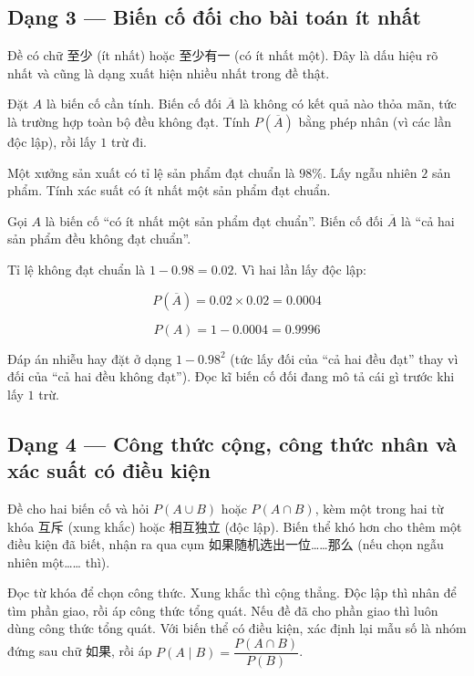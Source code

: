 \documentclass[11pt, a4paper]{article}
\begin{document}
\subsection{Dạng 3 — Biến cố đối cho bài toán ít nhất}

 Đề có chữ 至少 (ít nhất) hoặc 至少有一 (có ít nhất một). Đây là dấu hiệu rõ nhất và cũng là dạng xuất hiện nhiều nhất trong đề thật.

 Đặt $A$ là biến cố cần tính. Biến cố đối $\overline{A}$ là không có kết quả nào thỏa mãn, tức là trường hợp toàn bộ đều không đạt. Tính $P(\overline{A})$ bằng phép nhân (vì các lần độc lập), rồi lấy $1$ trừ đi.

\begin{vidu}[{3}]
Một xưởng sản xuất có tỉ lệ sản phẩm đạt chuẩn là $98\%$. Lấy ngẫu nhiên $2$ sản phẩm. Tính xác suất có ít nhất một sản phẩm đạt chuẩn.

Gọi $A$ là biến cố “có ít nhất một sản phẩm đạt chuẩn”. Biến cố đối $\overline{A}$ là “cả hai sản phẩm đều không đạt chuẩn”.

Tỉ lệ không đạt chuẩn là $1 - 0.98 = 0.02$. Vì hai lần lấy độc lập:

$$P(\overline{A}) = 0.02 \times 0.02 = 0.0004$$

$$P(A) = 1 - 0.0004 = 0.9996$$

 Đáp án nhiễu hay đặt ở dạng $1 - 0.98^2$ (tức lấy đối của “cả hai đều đạt” thay vì đối của “cả hai đều không đạt”). Đọc kĩ biến cố đối đang mô tả cái gì trước khi lấy $1$ trừ.

\end{vidu}
\subsection{Dạng 4 — Công thức cộng, công thức nhân và xác suất có điều kiện}

 Đề cho hai biến cố và hỏi $P(A \cup B)$ hoặc $P(A \cap B)$, kèm một trong hai từ khóa 互斥 (xung khắc) hoặc 相互独立 (độc lập). Biến thể khó hơn cho thêm một điều kiện đã biết, nhận ra qua cụm 如果随机选出一位……那么 (nếu chọn ngẫu nhiên một…… thì).

 Đọc từ khóa để chọn công thức. Xung khắc thì cộng thẳng. Độc lập thì nhân để tìm phần giao, rồi áp công thức tổng quát. Nếu đề đã cho phần giao thì luôn dùng công thức tổng quát. Với biến thể có điều kiện, xác định lại mẫu số là nhóm đứng sau chữ 如果, rồi áp $P(A \mid B) = \dfrac{P(A \cap B)}{P(B)}$.
\end{document}

